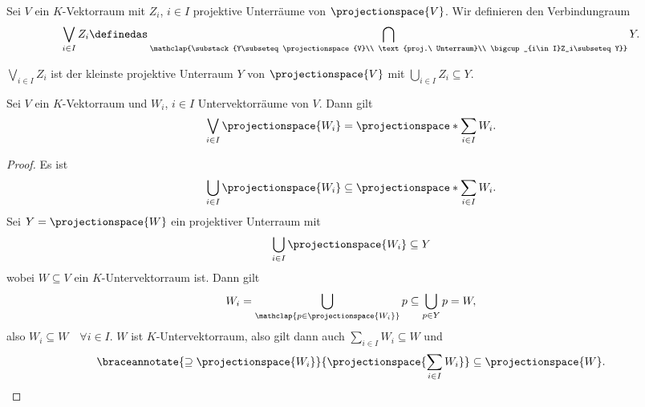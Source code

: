 \begin{definition*}
  Sei \( V \) ein \( K \)-Vektorraum mit \( Z_i \), \( i\in I \) projektive Unterräume von \( \projectionspace{V} \). Wir definieren den Verbindungraum
  \begin{equation*}
    \bigvee_{i\in I}Z_i\definedas \bigcap_{\mathclap{\substack{Y\subseteq \projectionspace{V}\\
    \text{proj.\ Unterraum}\\
    \bigcup_{i\in I}Z_i\subseteq Y}}}Y.
  \end{equation*}
\end{definition*}
\begin{bemerkung*}
  \( \bigvee_{i\in I}Z_i \) ist der kleinste projektive Unterraum \( Y \) von \( \projectionspace{V} \) mit \( \bigcup_{i\in I}Z_i\subseteq Y \).
\end{bemerkung*}
\begin{lemma}\label{projektiver_verbindungsraum_formel}
  Sei \( V \) ein \( K \)-Vektorraum und \( W_i \), \( i\in I \) Untervektorräume von \( V \). Dann gilt
  \begin{equation*}
    \bigvee_{i\in I}\projectionspace{W_i}=\projectionspace*{\sum_{i\in I} W_i}.
  \end{equation*}
\end{lemma}
\begin{proof}
  Es ist 
  \begin{equation*}
    \bigcup_{i\in I} \projectionspace{W_i}\subseteq \projectionspace*{\sum_{i\in I}W_i}.
  \end{equation*}
  Sei \( Y=\projectionspace{W}  \) ein projektiver Unterraum mit
  \begin{equation*}
    \bigcup_{i\in I} \projectionspace{W_i}\subseteq Y
  \end{equation*}
  wobei \( W\subseteq V \) ein \( K \)-Untervektorraum ist. Dann gilt
  \begin{equation*}
    W_i=\bigcup_{\mathclap{p\in \projectionspace{W_i}}}p\subseteq \bigcup_{p\in Y}p=W,
  \end{equation*}
  also \( W_i\subseteq W \quad \forall i\in I\). \( W \) ist \( K \)-Untervektorraum, also gilt dann auch \( \sum_{i\in I}W_i\subseteq  W\) und
  \begin{equation*}
    \braceannotate{\supseteq\projectionspace{W_i}}{\projectionspace{\sum_{i\in I}W_i}}\subseteq \projectionspace{W}.
  \end{equation*}
\end{proof}